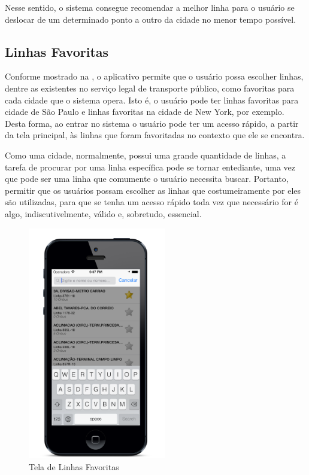 Nesse sentido, o sistema consegue recomendar a melhor linha para o usuário se deslocar de um determinado ponto a outro da cidade no menor tempo possível.

\subsection{Linhas Favoritas}

Conforme mostrado na , o aplicativo permite que o usuário possa escolher linhas, dentre as existentes no serviço legal de transporte público, como favoritas para cada cidade que o sistema opera. Isto é, o usuário pode ter linhas favoritas para cidade de São Paulo e linhas favoritas na cidade de New York, por exemplo. Desta forma, ao entrar no sistema o usuário pode ter um acesso rápido, a partir da tela principal, às linhas que foram favoritadas no contexto que ele se encontra.
	
Como uma cidade, normalmente, possui uma grande quantidade de linhas, a tarefa de procurar por uma linha específica pode se tornar entediante, uma vez que pode ser uma linha que comumente o usuário necessita buscar. Portanto, permitir que os usuários possam escolher as linhas que costumeiramente por eles são utilizadas, para que se tenha um acesso rápido toda vez que necessário for é algo, indiscutivelmente, válido e, sobretudo, essencial.
	
\begin{figure}[htp]
\begin{center}
  \includegraphics[width=6cm]{images/telas/linhasFavoritas.png}
  \caption{Tela de Linhas Favoritas}
  \label{fig:telaFavoritas}
\end{center}
\end{figure}


